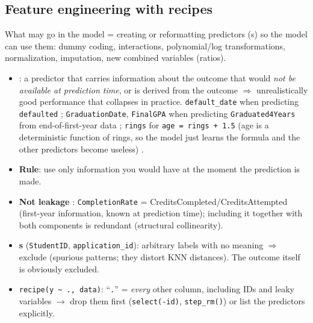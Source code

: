 \subsection{Feature engineering with recipes}
\begin{topic}{What may go in the model}
 = creating or reformatting predictors (s) so the model can use them: dummy coding, interactions, polynomial/log transformations, normalization, imputation, new combined variables (ratios).
\begin{itemize}
\item \textbf{}: a predictor that carries information about the outcome that would \emph{not be available at prediction time}, or is derived from the outcome $\Rightarrow$ unrealistically good performance that collapses in practice. \texttt{default\_date} when predicting \texttt{defaulted} ; \texttt{GraduationDate}, \texttt{FinalGPA} when predicting \texttt{Graduated4Years} from end-of-first-year data ; \texttt{rings} for \texttt{age = rings + 1.5} (age is a deterministic function of rings, so the model just learns the formula and the other predictors become useless) .
\item \textbf{Rule}: use only information you would have at the moment the prediction is made.
\item \textbf{Not leakage} : \texttt{CompletionRate} = CreditsCompleted/CreditsAttempted (first-year information, known at prediction time); including it together with both components is redundant (structural collinearity).
\item \textbf{s} (\texttt{StudentID}, \texttt{application\_id}): arbitrary labels with no meaning $\Rightarrow$ exclude (spurious patterns; they distort KNN distances). The outcome itself is obviously excluded.
\item \texttt{recipe(y \textasciitilde{} ., data)}: ``\texttt{.}'' = \emph{every} other column, including IDs and leaky variables $\to$ drop them first (\texttt{select(-id)}, \texttt{step\_rm()}) or list the predictors explicitly.
\end{itemize}
\end{topic}

